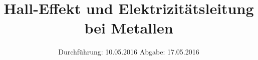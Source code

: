 

\subject{V 311}
\title{Hall-Effekt und Elektrizitätsleitung bei Metallen}
\date{
  Durchführung: 10.05.2016
  \hspace{3em}
  Abgabe: 17.05.2016
}



\maketitle
\thispagestyle{empty}
\tableofcontents
\newpage







\printbibliography


